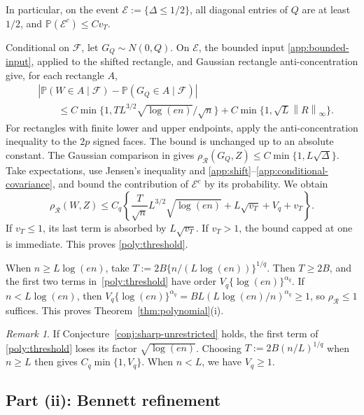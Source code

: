 \documentclass[11pt,letterpaper]{article}
\theoremstyle{remark}
\newtheorem{remark}{Remark}
\newcommand{\Pp}{\mathbb P}
\newcommand{\norm}[1]{\left\lVert#1\right\rVert}
\newcommand{\rh}{\rho_{\mathcal R}}
\begin{document}
{
In particular, on the event \(\mathcal E:=\{\Delta\le1/2\}\), all
diagonal entries of \(Q\) are at least \(1/2\), and
\(\Pp(\mathcal E^c)\le C v_T\).

Conditional on \(\mathcal F\), let \(G_Q\sim N(0,Q)\). On
\(\mathcal E\), the bounded input \eqref{app:bounded-input}, applied
to the shifted rectangle, and Gaussian rectangle anti-concentration
give, for each rectangle \(A\),
\begin{align*}
 &|\Pp(W\in A\mid\mathcal F)-\Pp(G_Q\in A\mid\mathcal F)|\\
 &\hspace{2em}\le
 C\min\{1,TL^{3/2}\sqrt{\log(en)}/\sqrt n\}
       +C\min\{1,\sqrt L\norm R_\infty\}.
\end{align*}
For rectangles with finite lower and upper endpoints, apply the
anti-concentration inequality to the \(2p\) signed faces. The bound
is unchanged up to an absolute constant. The Gaussian comparison in
\cite[Proposition~2.1]{CCKK2022} gives
\(\rh(G_Q,Z)\le C\min\{1,L\sqrt\Delta\}\).
Take expectations, use Jensen's inequality and
\eqref{app:shift}--\eqref{app:conditional-covariance}, and bound the
contribution of \(\mathcal E^c\) by its probability. We obtain
\[
 \rh(W,Z)\le C_q\left\{
 \frac{T}{\sqrt n}L^{3/2}\sqrt{\log(en)}
 +L\sqrt{v_T}+V_q+v_T\right\}.
\]
If \(v_T\le1\), its last term is absorbed by \(L\sqrt{v_T}\).
If \(v_T>1\), the bound capped at one is immediate. This proves
\eqref{poly:threshold}.

When \(n\ge L\log(en)\), take \(T:=2B\{n/(L\log(en))\}^{1/q}\).
Then \(T\ge2B\), and the first two terms in~\eqref{poly:threshold}
have order \(V_q\{\log(en)\}^{\alpha_q}\). If \(n<L\log(en)\), then
\(V_q\{\log(en)\}^{\alpha_q}=BL(L\log(en)/n)^{\alpha_q}\ge1\), so \(\rh\le1\)
suffices. This proves Theorem~\ref{thm:polynomial}\textup{(i)}. 

{
\begin{remark}\label{rmk:E1}
If
Conjecture~\ref{conj:sharp-unrestricted} holds, the first term of
\eqref{poly:threshold} loses its factor \(\sqrt{\log(en)}\).
Choosing \(T:=2B(n/L)^{1/q}\) when \(n\ge L\) then gives
\(C_q\min\{1,V_q\}\). When \(n<L\), we have \(V_q\ge1\).
\end{remark}
}


}\subsection{\texorpdfstring{{Part (ii): Bennett refinement}}{Part (ii): Bennett refinement}}\label{app:bennett}
\end{document}
